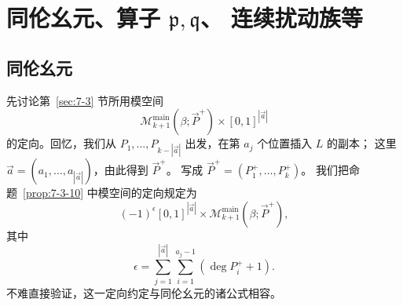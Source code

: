 
\section{\texorpdfstring{同伦幺元、算子 $\mathfrak p,\mathfrak q$、
连续扰动族等}{同伦幺元、算子 p、q、连续扰动族等}}
\label{sec:8-10}

\subsection{同伦幺元}
\label{subsec:8-10-1}

先讨论第~\ref{sec:7-3} 节所用模空间
\[
 \mathcal M_{k+1}^{\mathrm{main}}(\beta;\vec P^+)
 \times[0,1]^{|\vec a|}
\]
的定向。回忆，我们从
$P_1,\ldots,P_{k-|\vec a|}$ 出发，在第 $a_j$ 个位置插入 $L$ 的副本；
这里 $\vec a=(a_1,\ldots,a_{|\vec a|})$，由此得到 $\vec P^+$。
写成
$\vec P^+=(P_1^+,\ldots,P_k^+)$。
我们把命题~\ref{prop:7-3-10} 中模空间的定向规定为
\[
 (-1)^\epsilon[0,1]^{|\vec a|}
 \times\mathcal M_{k+1}^{\mathrm{main}}(\beta;\vec P^+),
\]
其中
\[
 \epsilon=
 \sum_{j=1}^{|\vec a|}\sum_{i=1}^{a_j-1}
 (\deg P_i^+ +1).
\]
不难直接验证，这一定向约定与同伦幺元的诸公式相容。
